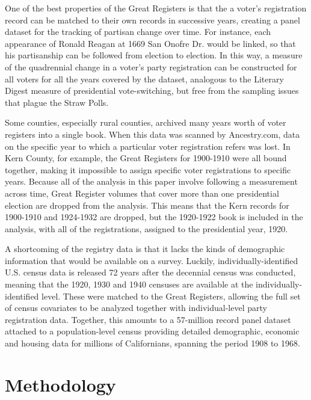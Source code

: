 \documentclass[11pt]{scrartcl}\usepackage[]{graphicx}\usepackage[]{color}
\begin{document}
One of the best properties of the Great Registers is that the a voter's registration record can be matched to their own records in successive years, creating a panel dataset for the tracking of partisan change over time.  For instance, each appearance of Ronald Reagan at 1669 San Onofre Dr. would be linked, so that his partisanship can be followed from election to election. In this way, a measure of the quadrennial change in a voter's party registration can be constructed for all voters for all the years covered by the dataset, analogous to the Literary Digest measure of presidential vote-switching, but free from the sampling issues  that plague the Straw Polls.  

Some counties, especially rural counties, archived many years worth of voter registers into a single book. When this data was scanned by Ancestry.com, data on the specific year to which a particular voter registration refers was lost. In Kern County, for example, the Great Registers for 1900-1910 were all bound together, making it impossible to assign specific voter registrations to specific years. Because all of the analysis in this paper involve following a measurement across time, Great Register volumes that cover more than one presidential election are dropped from the analysis.  This means that the Kern records for 1900-1910 and 1924-1932 are dropped, but the 1920-1922 book is included in the analysis, with all of the registrations, assigned to the presidential year, 1920. 

A shortcoming of the registry data is that it lacks the kinds of demographic information that would be available on a survey.  Luckily, individually-identified U.S. census data is released 72 years after the decennial census was conducted, meaning that the 1920, 1930 and 1940 censuses are available at the individually-identified level.  These were matched to the Great Registers, allowing the full set of census covariates to be analyzed together with individual-level party registration data. Together, this amounts to a 57-million record panel dataset attached to a population-level census providing detailed demographic, economic and housing data for millions of Californians, spanning the period 1908 to 1968. 


\section*{Methodology}
\end{document}
